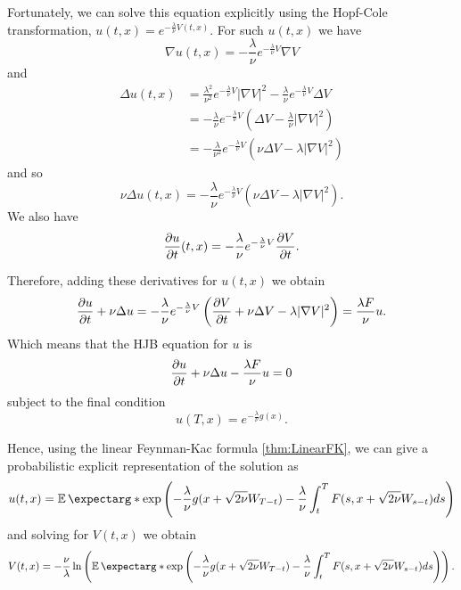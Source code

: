 Fortunately, we can solve this equation explicitly using the Hopf-Cole transformation, $u(t,x)= e^{-\frac{\lambda}{\nu} V(t,x)}$. For such $u(t,x)$ we have
\begin{equation}
	\nabla u(t,x)=-\frac{\lambda}{\nu} e^{-\frac{\lambda}{\nu} V}\nabla V
\end{equation}
and
\begin{equation}
	\begin{split}
		\Delta u(t,x)&=\frac{\lambda^2}{\nu^2} e^{-\frac{\lambda}{\nu} V}|\nabla V|^2-\frac{\lambda}{\nu} e^{-\frac{\lambda}{\nu} V}\Delta V \\
		&=-\frac{\lambda}{\nu} e^{-\frac{\lambda}{\nu} V}\left(\Delta V - \frac{\lambda}{\nu} |\nabla V|^2 \right)\\
		&=-\frac{\lambda}{\nu^2} e^{-\frac{\lambda}{\nu} V}\left(\nu\Delta V - \lambda |\nabla V|^2 \right)
	\end{split}
\end{equation}
and so
\begin{equation}
	\nu \Delta u(t,x)=-\frac{\lambda}{\nu} e^{-\frac{\lambda}{\nu} V}\left(\nu\Delta V - \lambda |\nabla V|^2 \right).
\end{equation}
We also have
\begin{equation}
	\frac{\partial u}{\partial t}(t,x)=-\frac{\lambda}{\nu} e^{-\frac{\lambda}{\nu} V} \frac{\partial V}{\partial t}.
\end{equation}

Therefore, adding these derivatives for $u(t,x)$ we obtain 
\begin{equation}
	\frac{\partial u}{\partial t}+\nu\Delta u=-\frac{\lambda}{\nu}e^{-\frac{\lambda}{\nu} V}\left(\frac{\partial V}{\partial t}+\nu \Delta V -\lambda |\nabla V|^2\right)=\frac{\lambda F}{\nu}u.
\end{equation}
Which means that the HJB equation for $u$ is 
\begin{equation}
	\frac{\partial u}{\partial t}+\nu \Delta u-\frac{\lambda F}{\nu}u=0
\end{equation}
subject to the final condition 
\begin{equation}
	u(T,x)=e^{-\frac{\lambda}{\nu} g(x)}.
\end{equation}

Hence, using the linear Feynman-Kac formula \autoref{thm:LinearFK}, we can give a probabilistic explicit representation of the solution as
\begin{equation}
	u(t,x)=\expect*{\exp\left(-\frac{\lambda}{\nu} g(x+\sqrt{2\nu}W_{T-t})-\frac{\lambda}{\nu}\int_{t}^{T}F(s,x+\sqrt{2\nu}W_{s-t})ds\right)}
\end{equation}
and solving for $V(t,x)$ we obtain
\begin{equation}
	\label{eqn:probabilisticExact}
	V(t,x)=-\frac{\nu}{\lambda}\ln\left(\expect*{\exp \left(-\frac{\lambda}{\nu} g(x+\sqrt{2\nu}W_{T-t})-\frac{\lambda}{\nu}\int_{t}^{T}F(s,x+\sqrt{2\nu}W_{s-t})ds\right)}\right).
\end{equation}